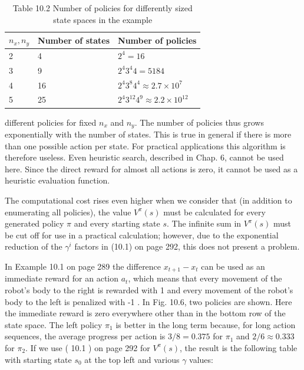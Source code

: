 \documentclass[10pt]{article}
\begin{document}
\begin{table}[h]
\begin{center}
\captionsetup{labelformat=empty}
\caption{Table 10.2 Number of policies for differently sized state spaces in the example}
\begin{tabular}{lll}
\hline
$n_{x}, n_{y}$ & Number of states & Number of policies \\
\hline
2 & 4 & $2^{4}=16$ \\
3 & 9 & $2^{4} 3^{4} 4=5184$ \\
\hline
4 & 16 & $2^{4} 3^{8} 4^{4} \approx 2.7 \times 10^{7}$ \\
\hline
5 & 25 & $2^{4} 3^{12} 4^{9} \approx 2.2 \times 10^{12}$ \\
\hline
\end{tabular}
\end{center}
\end{table}

different policies for fixed $n_{x}$ and $n_{y}$. The number of policies thus grows exponentially with the number of states. This is true in general if there is more than one possible action per state. For practical applications this algorithm is therefore useless. Even heuristic search, described in Chap. 6, cannot be used here. Since the direct reward for almost all actions is zero, it cannot be used as a heuristic evaluation function.

The computational cost rises even higher when we consider that (in addition to enumerating all policies), the value $V^{\pi}(s)$ must be calculated for every generated policy $\pi$ and every starting state $s$. The infinite sum in $V^{\pi}(s)$ must be cut off for use in a practical calculation; however, due to the exponential reduction of the $\gamma^{i}$ factors in (10.1) on page 292, this does not present a problem.

In Example 10.1 on page 289 the difference $x_{t+1}-x_{t}$ can be used as an immediate reward for an action $a_{t}$, which means that every movement of the robot's body to the right is rewarded with 1 and every movement of the robot's body to the left is penalized with -1 . In Fig. 10.6, two policies are shown. Here the immediate reward is zero everywhere other than in the bottom row of the state space. The left policy $\pi_{1}$ is better in the long term because, for long action sequences, the average progress per action is $3 / 8=0.375$ for $\pi_{1}$ and $2 / 6 \approx 0.333$ for $\pi_{2}$. If we use ( 10.1 ) on page 292 for $V^{\pi}(s)$, the result is the following table with starting state $s_{0}$ at the top left and various $\gamma$ values:
\end{document}
